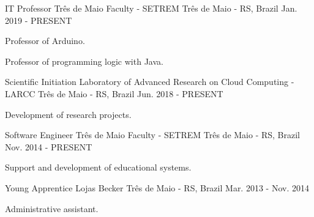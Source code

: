
\begin{cventries}
  \cventry
  {IT Professor} %
  {Três de Maio Faculty - SETREM} %
  {Três de Maio - RS, Brazil} %
  {Jan. 2019 - PRESENT} %
  {
    \begin{cvitems} %
      \item {Professor of Arduino.}
      \item {Professor of programming logic with Java.}
    \end{cvitems}
  }

  \cventry
  {Scientific Initiation} %
  {Laboratory of Advanced Research on Cloud Computing - LARCC} %
  {Três de Maio - RS, Brazil} %
  {Jun. 2018 - PRESENT} %
  {
    \begin{cvitems} %
      \item {Development of research projects.}
    \end{cvitems}
  }

  \cventry
  {Software Engineer} %
  {Três de Maio Faculty - SETREM} %
  {Três de Maio - RS, Brazil} %
  {Nov. 2014 - PRESENT} %
  {
    \begin{cvitems} %
      \item {Support and development of educational systems.}
    \end{cvitems}
  }

  \cventry
  {Young Apprentice} %
  {Lojas Becker} %
  {Três de Maio - RS, Brazil} %
  {Mar. 2013 - Nov. 2014} %
  {
    \begin{cvitems} %
      \item {Administrative assistant.}
    \end{cvitems}
  }
\end{cventries}

